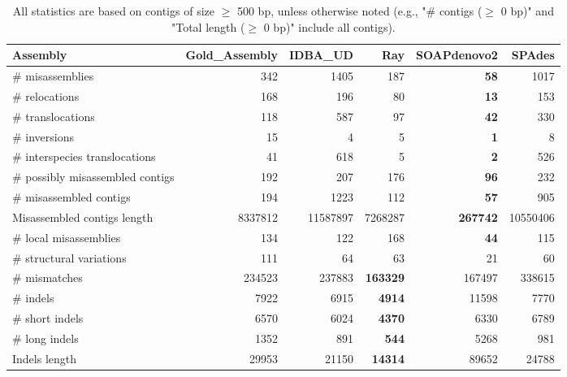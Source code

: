\documentclass[12pt,a4paper]{article}
\begin{document}
\begin{table}[ht]
\begin{center}
\caption{All statistics are based on contigs of size $\geq$ 500 bp, unless otherwise noted (e.g., "\# contigs ($\geq$ 0 bp)" and "Total length ($\geq$ 0 bp)" include all contigs).}
\begin{tabular}{|l*{5}{|r}|}
\hline
Assembly & Gold\_Assembly & IDBA\_UD & Ray & SOAPdenovo2 & SPAdes \\ \hline
\# misassemblies & 342 & 1405 & 187 & {\bf 58} & 1017 \\ \hline
\hspace{5mm}\# relocations & 168 & 196 & 80 & {\bf 13} & 153 \\ \hline
\hspace{5mm}\# translocations & 118 & 587 & 97 & {\bf 42} & 330 \\ \hline
\hspace{5mm}\# inversions & 15 & 4 & 5 & {\bf 1} & 8 \\ \hline
\hspace{5mm}\# interspecies translocations & 41 & 618 & 5 & {\bf 2} & 526 \\ \hline
\# possibly misassembled contigs & 192 & 207 & 176 & {\bf 96} & 232 \\ \hline
\# misassembled contigs & 194 & 1223 & 112 & {\bf 57} & 905 \\ \hline
Misassembled contigs length & 8337812 & 11587897 & 7268287 & {\bf 267742} & 10550406 \\ \hline
\# local misassemblies & 134 & 122 & 168 & {\bf 44} & 115 \\ \hline
\# structural variations & 111 & 64 & 63 & 21 & 60 \\ \hline
\# mismatches & 234523 & 237883 & {\bf 163329} & 167497 & 338615 \\ \hline
\# indels & 7922 & 6915 & {\bf 4914} & 11598 & 7770 \\ \hline
\hspace{5mm}\# short indels & 6570 & 6024 & {\bf 4370} & 6330 & 6789 \\ \hline
\hspace{5mm}\# long indels & 1352 & 891 & {\bf 544} & 5268 & 981 \\ \hline
Indels length & 29953 & 21150 & {\bf 14314} & 89652 & 24788 \\ \hline
\end{tabular}
\end{center}
\end{table}
\end{document}
